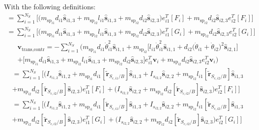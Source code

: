 \documentclass[paper]{aiaaNew}
\begin{document}
With the following definitions:
\begin{multline}
[A_{\text{contr}}] = \sum_{i=1}^{N_{S}}\bigg[\Big(m_{\text{sp}_{i1}}d_{i1} \bm{\hat{s}}_{i1,3} +m_{\text{sp}_{i2}}l_{i1} \bm{\hat{s}}_{i1,3}+m_{\text{sp}_{i2}} d_{i2}\bm{\hat{s}}_{i2,3}\Big)e_{i1}^T[F_i] +m_{\text{sp}_{i2}} d_{i2} \bm{\hat{s}}_{i2,3}e_{i2}^T[F_i] \bigg]
\end{multline}\begin{multline}
[B_{\text{contr}}] =  \sum_{i=1}^{N_{S}}\bigg[\Big(m_{\text{sp}_{i1}}d_{i1} \bm{\hat{s}}_{i1,3} +m_{\text{sp}_{i2}}l_{i1}\bm{\hat{s}}_{i1,3}+m_{\text{sp}_{i2}} d_{i2}\bm{\hat{s}}_{i2,3}\Big) e_{i1}^T[G_i] +m_{\text{sp}_{i2}} d_{i2} \bm{\hat{s}}_{i2,3} e_{i2}^T[G_i]\bigg]
\end{multline}\begin{multline}
\bm v_{\text{trans,contr}} = -\sum_{i=1}^{N_{S}}\bigg(m_{\text{sp}_{i1}}d_{i1} \dot{\theta}_{i1}^2 \bm{\hat{s}}_{i1,1} +m_{\text{sp}_{i2}}\Big[l_{i1} \dot{\theta}_{i1}^2 \bm{\hat{s}}_{i1,1} + d_{i2}\big(\dot{\theta}_{i1} + \dot{\theta}_{i2}\big)^2\bm{\hat{s}}_{i2,1}\Big]\\
+\Big[m_{\text{sp}_{i1}}d_{i1} \bm{\hat{s}}_{i1,3} +m_{\text{sp}_{i2}}l_{i1} \bm{\hat{s}}_{i1,3}+m_{\text{sp}_{i2}} d_{i2}\bm{\hat{s}}_{i2,3}\Big]e_{i1}^T\bm v_i 
+m_{\text{sp}_{i2}} d_{i2} \bm{\hat{s}}_{i2,3}e_{i2}^T\bm v_i \bigg) 
\end{multline}\begin{multline}
[C_{\text{contr}}] = \sum\limits_{i=1}^{N_S} \bigg[  \big(I_{s_{i1,2}}\bm{\hat{s}}_{i1,2}+m_{\text{sp}_{i1}}d_{i1} [\tilde{\bm{r}}_{S_{c,i1}/B}]   \bm{\hat{s}}_{i1,3} + I_{s_{i2,2}}\bm{\hat{s}}_{i2,2}
+m_{\text{sp}_{i2}}l_{i1} [\tilde{\bm{r}}_{S_{c,i2}/B}]  \bm{\hat{s}}_{i1,3}\\
+m_{\text{sp}_{i2}}d_{i2} [\tilde{\bm{r}}_{S_{c,i2}/B}] \bm{\hat{s}}_{i2,3}\big)e_{i1}^T[F_i]
+\big( I_{s_{i2,2}}\bm{\hat{s}}_{i2,2}+m_{\text{sp}_{i2}} d_{i2} [\tilde{\bm{r}}_{S_{c,i2}/B}] \bm{\hat{s}}_{i2,3}\big)e_{i2}^T[F_i] \bigg]
\end{multline}\begin{multline}
[D_{\text{contr}}] = \sum\limits_{i=1}^{N_S} \bigg[  \big(I_{s_{i1,2}}\bm{\hat{s}}_{i1,2}+m_{\text{sp}_{i1}}d_{i1} [\tilde{\bm{r}}_{S_{c,i1}/B}]   \bm{\hat{s}}_{i1,3} + I_{s_{i2,2}}\bm{\hat{s}}_{i2,2}+m_{\text{sp}_{i2}}l_{i1} [\tilde{\bm{r}}_{S_{c,i2}/B}]  \bm{\hat{s}}_{i1,3}\\
+m_{\text{sp}_{i2}}d_{i2} [\tilde{\bm{r}}_{S_{c,i2}/B}] \bm{\hat{s}}_{i2,3}\big)e_{i1}^T[G_i] +\big( I_{s_{i2,2}}\bm{\hat{s}}_{i2,2}+m_{\text{sp}_{i2}} d_{i2} [\tilde{\bm{r}}_{S_{c,i2}/B}] \bm{\hat{s}}_{i2,3}\big)e_{i2}^T[G_i] \bigg]\

\end{multline}
\end{document}
